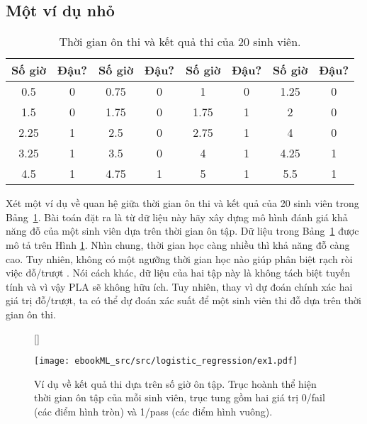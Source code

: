 \subsection{Một ví dụ nhỏ}
\begin{table}[]
\centering
\caption{Thời gian ôn thi và kết quả thi của 20 sinh viên. }
\label{tab:10_1}
\begin{tabular}{|c|c||c|c||c|c||c|c|}
\hline
\textbf{Số giờ} & \textbf{Đậu?} & \textbf{Số giờ} & \textbf{Đậu?} & \textbf{Số giờ} & \textbf{Đậu?} & \textbf{Số giờ} & \textbf{Đậu?} \\ \hline \hline 
0.5            & 0             & 0.75           & 0             & 1              & 0             & 1.25           & 0             \\ \hline
1.5            & 0             & 1.75           & 0             & 1.75           & 1             & 2              & 0             \\ \hline
2.25           & 1             & 2.5            & 0             & 2.75           & 1             & 4              & 0             \\ \hline
3.25           & 1             & 3.5            & 0             & 4              & 1             & 4.25           & 1             \\ \hline
4.5            & 1             & 4.75           & 1             & 5              & 1             & 5.5            & 1             \\ \hline
\end{tabular}
\end{table}

Xét một ví dụ về quan hệ giữa thời gian ôn thi và kết quả của 20 sinh
viên trong Bảng~\ref{tab:10_1}. Bài toán đặt ra là từ dữ liệu này hãy
xây dựng mô hình đánh giá khả năng đỗ của một sinh viên dựa trên thời gian
ôn tập. Dữ liệu trong Bảng~\ref{tab:10_1} được mô tả trên Hình \ref{fig:10_1}.
Nhìn chung, thời gian học càng nhiều thì khả năng đỗ càng cao. Tuy nhiên, không
có một ngưỡng thời gian học nào giúp phân biệt rạch ròi việc đỗ/trượt . Nói cách
khác, dữ liệu của hai tập này là không tách biệt tuyến tính và vì vậy PLA sẽ
không hữu ích. Tuy nhiên, thay vì dự đoán chính xác hai giá trị đỗ/trượt,
ta có thể dự đoán xác suất để một sinh viên thi đỗ dựa trên thời gian ôn thi.

\begin{figure}[t]
    [\FBwidth]
    {\caption{ 
    Ví dụ về kết quả thi dựa trên số giờ ôn tập. Trục hoành thể hiện thời gian ôn tập của mỗi sinh viên, trục tung gồm hai giá trị 0/fail (các điểm hình tròn) và 1/pass (các điểm hình vuông).  
    }
    \label{fig:10_1}}
    { %
    \texttt{[image: ebookML\_src/src/logistic\_regression/ex1.pdf]}
    }
\end{figure}

